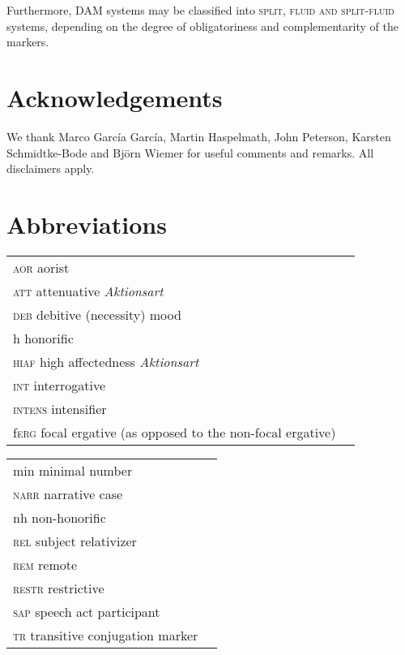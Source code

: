 \documentclass[output=paper]{LSP/langsci}
\begin{document}
Furthermore, DAM systems may be classified into \textsc{split, fluid and split-fluid} systems, depending on the degree of obligatoriness and complementarity of the markers.

\section*{Acknowledgements}

We thank Marco García García, Martin Haspelmath, John Peterson, Karsten Schmidtke-Bode and Björn Wiemer for useful comments and remarks. 
All disclaimers apply.









\section*{Abbreviations}
\begin{tabularx}{.45\textwidth}{lQ}
\textsc{aor}		aorist\\
\textsc{att}		attenuative \textit{Aktionsart}\\
\textsc{deb}		debitive (necessity) mood\\
h		honorific\\
\textsc{hiaf}		high affectedness \textit{Aktionsart}\\
\textsc{int}		interrogative\\
\textsc{intens}	intensifier\\
f\textsc{erg}		focal ergative (as opposed to the non-focal ergative)\\
\end{tabularx}
\begin{tabularx}{.45\textwidth}{lQ}
min		minimal number\\
\textsc{narr}		narrative case\\
nh		non-honorific\\
\textsc{rel}		subject relativizer\\
\textsc{rem}		remote\\
\textsc{restr}	restrictive\\
\textsc{sap}		speech act participant\\
\textsc{tr}		transitive conjugation marker\\
\end{tabularx}

{\sloppy
\printbibliography[heading=subbibliography,notkeyword=this] }
\end{document}
